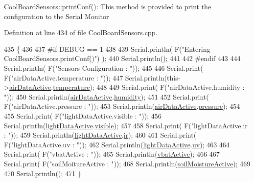 \hyperlink{class_cool_board_sensors_af6fd79505815b204c178617ecf54c873}{Cool\+Board\+Sensors\+::print\+Conf()}\+: This method is provided to print the configuration to the Serial Monitor 

Definition at line 434 of file Cool\+Board\+Sensors.\+cpp.


\begin{DoxyCode}
435 \{
436 
437 \textcolor{preprocessor}{#if DEBUG == 1}
438 
439     Serial.println( F(\textcolor{stringliteral}{"Entering CoolBoardSensors.printConf()"}) );
440     Serial.println();
441 
442 \textcolor{preprocessor}{#endif}
443 
444     Serial.println( F(\textcolor{stringliteral}{"Sensors Configuration : "}));
445     
446     Serial.print( F(\textcolor{stringliteral}{"airDataActive.temperature : "}));
447     Serial.println(this->\hyperlink{class_cool_board_sensors_abff8dfeccb2f7689847bb64d5f1cd31e}{airDataActive}.\hyperlink{struct_cool_board_sensors_1_1air_active_a9a6633c426b0508e30ebc1832ec6d745}{temperature});
448 
449     Serial.print( F(\textcolor{stringliteral}{"airDataActive.humidity : "}));
450     Serial.println(\hyperlink{class_cool_board_sensors_abff8dfeccb2f7689847bb64d5f1cd31e}{airDataActive}.\hyperlink{struct_cool_board_sensors_1_1air_active_ae5740445054b27415e22f450576accb7}{humidity});
451 
452     Serial.print( F(\textcolor{stringliteral}{"airDataActive.pressure : "}));
453     Serial.println(\hyperlink{class_cool_board_sensors_abff8dfeccb2f7689847bb64d5f1cd31e}{airDataActive}.\hyperlink{struct_cool_board_sensors_1_1air_active_ab200826a70d1dc9945f5efb6b9c732ed}{pressure});
454 
455     Serial.print( F(\textcolor{stringliteral}{"lightDataActive.visible : "}));
456     Serial.println(\hyperlink{class_cool_board_sensors_ac4deb1cf41bac8b91c780c92fab00ba4}{lightDataActive}.\hyperlink{struct_cool_board_sensors_1_1light_active_abcbba296b6a95e67c0cd2555d9dd50c7}{visible});
457 
458     Serial.print( F(\textcolor{stringliteral}{"lightDataActive.ir : "}));
459     Serial.println(\hyperlink{class_cool_board_sensors_ac4deb1cf41bac8b91c780c92fab00ba4}{lightDataActive}.\hyperlink{struct_cool_board_sensors_1_1light_active_a67700895349b95ceb263f1a6da756315}{ir});
460 
461     Serial.print( F(\textcolor{stringliteral}{"lightDataActive.uv : "}));
462     Serial.println(\hyperlink{class_cool_board_sensors_ac4deb1cf41bac8b91c780c92fab00ba4}{lightDataActive}.\hyperlink{struct_cool_board_sensors_1_1light_active_a949a7aaf5166d981de8fe0fd93da20d6}{uv});
463     
464     Serial.print( F(\textcolor{stringliteral}{"vbatActive : "}));
465     Serial.println(\hyperlink{class_cool_board_sensors_af5039ad760b0ff0aa7eee16c55e81702}{vbatActive});
466 
467     Serial.print( F(\textcolor{stringliteral}{"soilMoitureActive : "}));
468     Serial.println(\hyperlink{class_cool_board_sensors_a31983eecc0f9cd000e1f912206ea4dc8}{soilMoistureActive});
469 
470     Serial.println();
471 \}
\end{DoxyCode}
